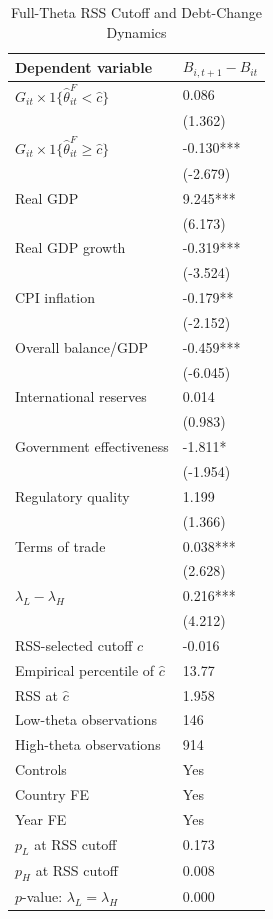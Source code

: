 \documentclass[11pt]{article}
\theoremstyle{definition}
\begin{document}
\begin{table}[H]\centering
\begin{threeparttable}
\caption{Full-Theta RSS Cutoff and Debt-Change Dynamics}
\label{tab:deltaB_rss_cutoff_fulltheta}
\scriptsize
\begin{tabularx}{\textwidth}{lY}
\toprule
Dependent variable & $B_{i,t+1}-B_{it}$ \\
\midrule
$G_{it}\times 1\{\widehat{\theta}^{F}_{it}<\widehat{c}\}$ & 0.086 \\
 & (1.362) \\
$G_{it}\times 1\{\widehat{\theta}^{F}_{it}\geq\widehat{c}\}$ & -0.130*** \\
 & (-2.679) \\
Real GDP & 9.245*** \\
 & (6.173) \\
Real GDP growth & -0.319*** \\
 & (-3.524) \\
CPI inflation & -0.179** \\
 & (-2.152) \\
Overall balance/GDP & -0.459*** \\
 & (-6.045) \\
International reserves & 0.014 \\
 & (0.983) \\
Government effectiveness & -1.811* \\
 & (-1.954) \\
Regulatory quality & 1.199 \\
 & (1.366) \\
Terms of trade & 0.038*** \\
 & (2.628) \\
$\lambda_L-\lambda_H$ & 0.216*** \\
 & (4.212) \\
\midrule
RSS-selected cutoff $\widehat{c}$ & -0.016 \\
Empirical percentile of $\widehat{c}$ & 13.77 \\
RSS at $\widehat{c}$ & 1.958 \\
Low-theta observations & 146 \\
High-theta observations & 914 \\
Controls & Yes \\
Country FE & Yes \\
Year FE & Yes \\
$p_L$ at RSS cutoff & 0.173 \\
$p_H$ at RSS cutoff & 0.008 \\
$p$-value: $\lambda_L=\lambda_H$ & 0.000 \\

\end{tabularx}
\end{threeparttable}
\end{table}
\end{document}
